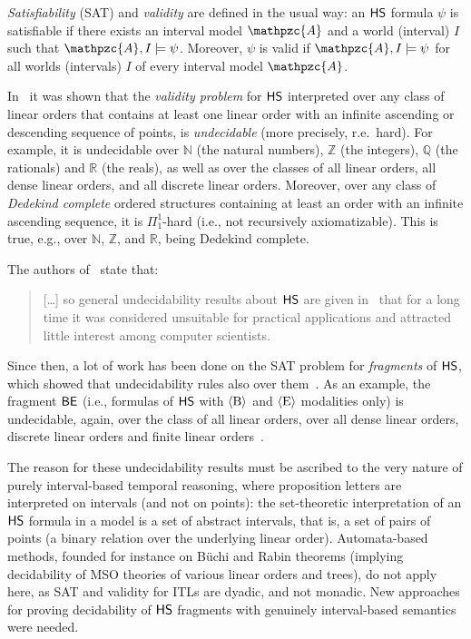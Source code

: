 \emph{Satisfiability} (SAT) and \emph{validity} are defined in the usual way: an $\text{\sffamily HS}$ formula $\psi$ is satisfiable if there exists an interval model $\mathpzc{A}$ and a world (interval) $I$ such that $\mathpzc{A},I\models \psi$. Moreover, $\psi$ is valid if $\mathpzc{A},I\models \psi$ for all worlds (intervals) $I$ of every interval model $\mathpzc{A}$. 



In~\cite{HS91}  
it was shown that the \emph{validity problem} for $\text{\sffamily HS}$ interpreted
over any class of linear orders that contains at least one linear order with an
infinite ascending or descending sequence of points,
 is \emph{undecidable} (more precisely, r.e.\ hard).
For example, it is undecidable over $\mathbb{N}$ (the natural numbers), $\mathbb{Z}$ (the integers), $\mathbb{Q}$ (the rationals) and $\mathbb{R}$ (the reals), 
as well as over the classes of all linear orders, all dense linear orders, and all discrete linear orders.
%
Moreover, over any class of \emph{Dedekind complete} ordered structures containing at least an order with an infinite ascending sequence,
it is $\Pi_1^1$-hard (i.e., not recursively axiomatizable). This is true, e.g., over $\mathbb{N}$, $\mathbb{Z}$,  and $\mathbb{R}$, being Dedekind complete. 

The authors of~\cite{DBLP:journals/eatcs/MonicaGMS11} state that:
\begin{quote}
[\dots] so general undecidability results about $\text{\sffamily HS}$ are given in~\cite{HS91}
that for a long time it was considered unsuitable for practical applications and
attracted little interest among computer scientists.  
\end{quote}

Since then, a lot of work has been done on the SAT
problem for \emph{fragments} of $\text{\sffamily HS}$, which showed that undecidability rules also over
them~\cite{Bresolin2008,DBLP:conf/time/BresolinMGMS09,DBLP:journals/amai/BresolinMGMS14,DBLP:conf/asian/Lodaya00,DBLP:journals/fuin/MarcinkowskiM14}. As an example, the fragment $\mathsf{BE}$ (i.e., formulas of $\text{\sffamily HS}$ with $\operatorname{\langle B\rangle}$ and $\operatorname{\langle E\rangle}$ modalities only) is undecidable, again, over the class of all linear orders, over all dense linear orders, discrete linear orders and finite linear orders~\cite{DBLP:conf/asian/Lodaya00}.

The reason for these undecidability results must be ascribed to the very nature of purely interval-based temporal reasoning, where 
proposition letters are interpreted on 
intervals (and not on points): 
the set-theoretic interpretation of an
$\text{\sffamily HS}$ formula in a model is a set of abstract intervals, that is, a set of pairs of points (a binary relation over the underlying linear order).
%
Automata-based methods, founded for instance on Büchi and Rabin theorems (implying decidability of MSO theories of various linear orders and trees), do not apply here, as SAT and validity for ITLs are
dyadic, and not monadic. New approaches for proving decidability of $\text{\sffamily HS}$ fragments with genuinely interval-based semantics were needed.


